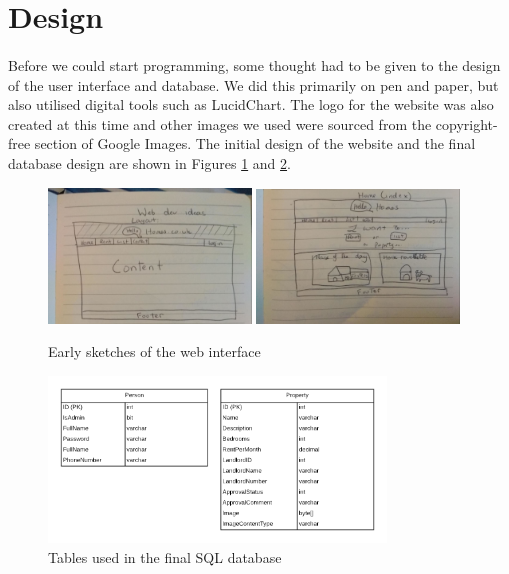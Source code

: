 \documentclass{article}
\begin{document}
\FloatBarrier
\section{Design}
    \paragraph{}
        Before we could start programming, some thought had to be given to the design of the user interface and database.
        We did this primarily on pen and paper, but also utilised digital tools such as LucidChart.
        The logo for the website was also created at this time and other images we used were sourced from the copyright-free section of Google Images.
        The initial design of the website and the final database design are shown in Figures \ref{fig:early_sketches} and \ref{fig:sql_tables}.

        \begin{figure}[ht]
            \centering
            \includegraphics[width=0.48\textwidth]{figures/layout_sketch1.png}
            \includegraphics[width=0.48\textwidth]{figures/layout_sketch2.png}
            \caption[Early Sketches]{Early sketches of the web interface}
            \label{fig:early_sketches}
        \end{figure}

        \begin{figure}[ht]
            \centering
            \includegraphics[width=0.8\textwidth]{figures/sql_tables.png}
            \caption[SQL Tables]{Tables used in the final SQL database}
            \label{fig:sql_tables}
        \end{figure}
\end{document}

